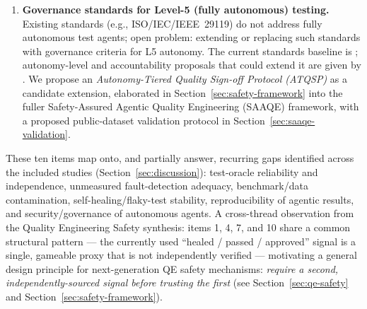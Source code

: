 \begin{enumerate}
        As AI increasingly writes both code and its tests, independence
        between implementation and verification erodes; open problem:
        validation strategies that preserve independence when both
        artifacts share a generative origin. See the oracle-
        independence evidence under item 1 in this roadmap
        \cite{panickssery2024evaluators,wataoka2024selfpreference},
        which is the same underlying mechanism.
  \item \textbf{Governance standards for Level-5 (fully autonomous)
        testing.} Existing standards (e.g., ISO/IEC/IEEE~29119) do not
        address fully autonomous test agents; open problem: extending
        or replacing such standards with governance criteria for L5
        autonomy. The current standards baseline is
        \cite{iso2020tr29119,iso2025ts42119}; autonomy-level and
        accountability proposals that could extend it are given by
        \cite{feng2025autonomylevels,treude2026accountable,
        cheng2026threepillar}. We propose an \emph{Autonomy-Tiered
        Quality Sign-off Protocol (ATQSP)} as a candidate extension,
        elaborated in Section~\ref{sec:safety-framework} into the fuller
        Safety-Assured Agentic Quality Engineering (SAAQE) framework,
        with a proposed public-dataset validation protocol in
        Section~\ref{sec:saaqe-validation}.
\end{enumerate}

These ten items map onto, and partially answer, recurring gaps
identified across the included studies (Section~\ref{sec:discussion}):
test-oracle reliability and independence, unmeasured fault-detection
adequacy, benchmark/data contamination, self-healing/flaky-test
stability, reproducibility of agentic results, and security/governance
of autonomous agents.
A cross-thread observation from the Quality Engineering Safety
synthesis: items 1, 4, 7, and 10 share a common structural pattern —
the currently used ``healed / passed / approved'' signal is a single,
gameable proxy that is not independently verified — motivating a
general design principle for next-generation QE safety mechanisms:
\emph{require a second, independently-sourced signal before trusting
the first} (see Section~\ref{sec:qe-safety} and Section~\ref{sec:safety-framework}).
